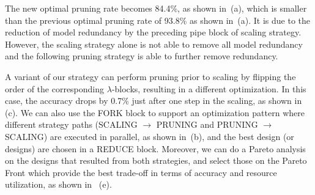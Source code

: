 The new optimal pruning rate becomes 84.4\%, as shown in~(a), which is smaller than the previous optimal pruning rate of 93.8\% as shown in~(a). It is due to the reduction of model redundancy by the preceding pipe block of scaling strategy. However, the scaling strategy alone is not able to remove all model redundancy and the following pruning strategy is able to further remove redundancy. 



A variant of our strategy can perform pruning prior to scaling by flipping the order of the corresponding $\lambda$-blocks, resulting in a different optimization. 
In this case, the accuracy drops by 0.7\% just after one step in the scaling, as shown in~ (c).
We can also use the FORK block to support an optimization pattern where different strategy paths (SCALING $\rightarrow$ PRUNING and PRUNING $\rightarrow$ SCALING) are executed in parallel, as shown in~(b), and the best design (or designs) are chosen in a REDUCE block.  Moreover, we can do a Pareto analysis on the designs that resulted from both strategies, and select those on the Pareto Front which provide the best trade-off in terms of accuracy and resource utilization, as shown in~  (e). 







